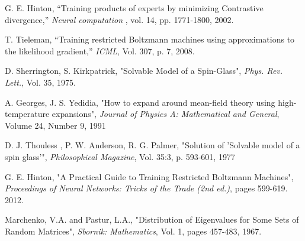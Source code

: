 \begin{thebibliography}{9}

G. E. Hinton, “Training products of experts by minimizing Contrastive divergence,”
\textit{Neural computation}
, vol. 14, pp. 1771-1800, 2002.

T. Tieleman, “Training restricted Boltzmann machines using approximations to the likelihood gradient,”
\textit{ICML}, Vol. 307, p. 7, 2008.

D. Sherrington, S. Kirkpatrick,
"Solvable Model of a Spin-Glass",
\textit{Phys. Rev. Lett.}, Vol. 35, 1975.

A. Georges, J. S. Yedidia,
"How to expand around mean-field theory using high-temperature expansions",
\textit{Journal of Physics A: Mathematical and General}, Volume 24, Number 9, 1991

D. J. Thouless , P. W. Anderson, R. G. Palmer,
"Solution of 'Solvable model of a spin glass'",
\textit{Philosophical Magazine}, Vol. 35:3, p. 593-601, 1977


G. E. Hinton, "A Practical Guide to Training Restricted Boltzmann Machines", \textit{Proceedings of Neural Networks: Tricks of the Trade (2nd ed.)}, pages 599-619. 2012. 

Marchenko, V.A. and Pastur, L.A., "Distribution of Eigenvalues for Some Sets of Random Matrices", \textit{Sbornik: Mathematics}, Vol. 1, pages 457-483, 1967.



\end{thebibliography}
